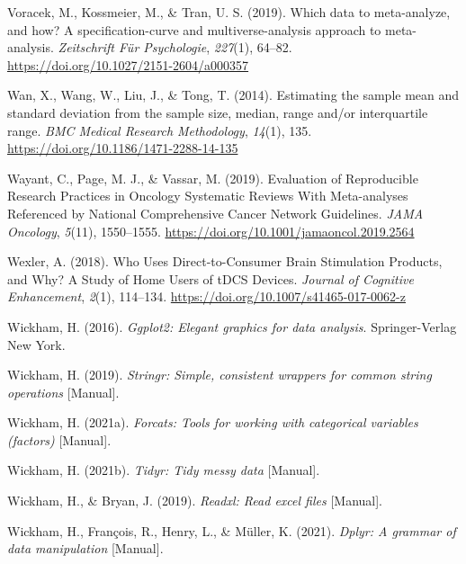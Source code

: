 \documentclass[
  man,floatsintext]{apa6}
\newlength{\cslhangindent}
\newlength{\cslentryspacingunit} %
\newenvironment{CSLReferences}[2] %
 {%
  \setlength{\parindent}{0pt}
  \ifodd #1
  \let\oldpar\par
  \def\par{\hangindent=\cslhangindent\oldpar}
  \fi
  \setlength{\parskip}{#2\cslentryspacingunit}
 }%
 {}
\begin{document}
\begin{CSLReferences}{1}{0}
\leavevmode{}%
Voracek, M., Kossmeier, M., \& Tran, U. S. (2019). Which data to meta-analyze, and how? {A} specification-curve and multiverse-analysis approach to meta-analysis. \emph{Zeitschrift Für Psychologie}, \emph{227}(1), 64--82. \url{https://doi.org/10.1027/2151-2604/a000357}

\leavevmode{}%
Wan, X., Wang, W., Liu, J., \& Tong, T. (2014). Estimating the sample mean and standard deviation from the sample size, median, range and/or interquartile range. \emph{BMC Medical Research Methodology}, \emph{14}(1), 135. \url{https://doi.org/10.1186/1471-2288-14-135}

\leavevmode{}%
Wayant, C., Page, M. J., \& Vassar, M. (2019). Evaluation of {Reproducible Research Practices} in {Oncology Systematic Reviews With Meta-analyses Referenced} by {National Comprehensive Cancer Network Guidelines}. \emph{JAMA Oncology}, \emph{5}(11), 1550--1555. \url{https://doi.org/10.1001/jamaoncol.2019.2564}

\leavevmode{}%
Wexler, A. (2018). Who {Uses Direct-to-Consumer Brain Stimulation Products}, and {Why}? {A Study} of {Home Users} of {tDCS Devices}. \emph{Journal of Cognitive Enhancement}, \emph{2}(1), 114--134. \url{https://doi.org/10.1007/s41465-017-0062-z}

\leavevmode{}%
Wickham, H. (2016). \emph{Ggplot2: {Elegant} graphics for data analysis}. {Springer-Verlag New York}.

\leavevmode{}%
Wickham, H. (2019). \emph{Stringr: {Simple}, consistent wrappers for common string operations} {[}Manual{]}.

\leavevmode{}%
Wickham, H. (2021a). \emph{Forcats: {Tools} for working with categorical variables (factors)} {[}Manual{]}.

\leavevmode{}%
Wickham, H. (2021b). \emph{Tidyr: {Tidy} messy data} {[}Manual{]}.

\leavevmode{}%
Wickham, H., \& Bryan, J. (2019). \emph{Readxl: {Read} excel files} {[}Manual{]}.

\leavevmode{}%
Wickham, H., François, R., Henry, L., \& Müller, K. (2021). \emph{Dplyr: {A} grammar of data manipulation} {[}Manual{]}.


\end{CSLReferences}
\end{document}
